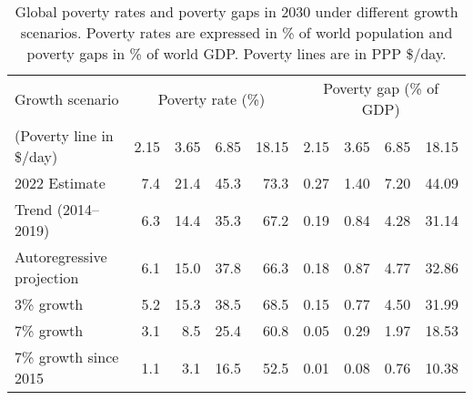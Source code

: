 \begin{table}[h]

\caption[Global poverty (rates and gaps) in 2030 under different growth scenarios.]{\label{tab:poverty}Global poverty rates and poverty gaps in 2030 under different growth scenarios. Poverty rates are expressed in \% of world population and poverty gaps in \% of world GDP. Poverty lines are in PPP \$/day.}
\centering
\begin{tabular}[t]{lrrrrrrrr}
\toprule Growth scenario & \multicolumn{4}{c}{Poverty rate (\%)} & \multicolumn{4}{c}{Poverty gap (\% of GDP)} \\ 
 (Poverty line in \$/day)  & 2.15 & 3.65 & 6.85 & 18.15 & 2.15 & 3.65 & 6.85 & 18.15\\
\midrule
2022 Estimate & 7.4 & 21.4 & 45.3 & 73.3 & 0.27 & 1.40 & 7.20 & 44.09\\
Trend (2014--2019) & 6.3 & 14.4 & 35.3 & 67.2 & 0.19 & 0.84 & 4.28 & 31.14\\
Autoregressive projection & 6.1 & 15.0 & 37.8 & 66.3 & 0.18 & 0.87 & 4.77 & 32.86\\
3\% growth & 5.2 & 15.3 & 38.5 & 68.5 & 0.15 & 0.77 & 4.50 & 31.99\\
7\% growth & 3.1 & 8.5 & 25.4 & 60.8 & 0.05 & 0.29 & 1.97 & 18.53\\
7\% growth since 2015 & 1.1 & 3.1 & 16.5 & 52.5 & 0.01 & 0.08 & 0.76 & 10.38\\
\bottomrule
\end{tabular}
\end{table}